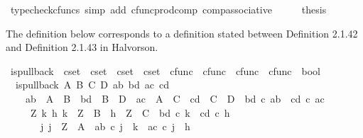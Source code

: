 \begin{isabellebody}
\ {\isacharparenleft}{\kern0pt}typecheck{\isacharunderscore}{\kern0pt}cfuncs{\isacharcomma}{\kern0pt}\ simp\ add{\isacharcolon}{\kern0pt}\ cfunc{\isacharunderscore}{\kern0pt}prod{\isacharunderscore}{\kern0pt}comp\ comp{\isacharunderscore}{\kern0pt}associative{}{\isacharparenright}{\kern0pt}\isanewline
\ \ \isamarkupfalse%
\ \isamarkupfalse%
\ {\isacharquery}{\kern0pt}thesis\isacommand{{\isachardot}{\kern0pt}}\isamarkupfalse%
\isanewline
{}\isamarkupfalse%
%
\endisatagproof
{\isafoldproof}%
%
\isadelimproof
%
\endisadelimproof
%
\isadelimdocument
%
\endisadelimdocument
%
\isatagdocument
%
\isamarkuptrue%
%
\endisatagdocument
{\isafolddocument}%
%
\isadelimdocument
%
\endisadelimdocument
%
\begin{isamarkuptext}%
The definition below corresponds to a definition stated between Definition 2.1.42 and Definition 2.1.43 in Halvorson.%
\end{isamarkuptext}\isamarkuptrue%
\isamarkupfalse%
\ is{\isacharunderscore}{\kern0pt}pullback\ {\isacharcolon}{\kern0pt}{\isacharcolon}{\kern0pt}\ {\isachardoublequoteopen}cset\ {\isasymRightarrow}\ cset\ {\isasymRightarrow}\ cset\ {\isasymRightarrow}\ cset\ {\isasymRightarrow}\ cfunc\ {\isasymRightarrow}\ cfunc\ {\isasymRightarrow}\ cfunc\ {\isasymRightarrow}\ cfunc\ {\isasymRightarrow}\ bool{\isachardoublequoteclose}\ \isanewline
\ \ {\isachardoublequoteopen}is{\isacharunderscore}{\kern0pt}pullback\ A\ B\ C\ D\ ab\ bd\ ac\ cd\ {\isasymlongleftrightarrow}\ \isanewline
\ \ \ \ {\isacharparenleft}{\kern0pt}ab\ {\isacharcolon}{\kern0pt}\ A\ {\isasymrightarrow}\ B\ {\isasymand}\ bd\ {\isacharcolon}{\kern0pt}\ B\ {\isasymrightarrow}\ D\ {\isasymand}\ ac\ {\isacharcolon}{\kern0pt}\ A\ {\isasymrightarrow}\ C\ {\isasymand}\ cd\ {\isacharcolon}{\kern0pt}\ C\ {\isasymrightarrow}\ D\ {\isasymand}\ bd\ {\isasymcirc}\isactrlsub c\ ab\ {\isacharequal}{\kern0pt}\ cd\ {\isasymcirc}\isactrlsub c\ ac\ {\isasymand}\ \isanewline
\ \ \ \ {\isacharparenleft}{\kern0pt}{\isasymforall}\ Z\ k\ h{\isachardot}{\kern0pt}\ {\isacharparenleft}{\kern0pt}k\ {\isacharcolon}{\kern0pt}\ Z\ {\isasymrightarrow}\ B\ {\isasymand}\ h\ {\isacharcolon}{\kern0pt}\ Z\ {\isasymrightarrow}\ C\ {\isasymand}\ bd\ {\isasymcirc}\isactrlsub c\ k\ {\isacharequal}{\kern0pt}\ cd\ {\isasymcirc}\isactrlsub c\ h{\isacharparenright}{\kern0pt}\ \ {\isasymlongrightarrow}\isanewline
\ \ \ \ \ \ {\isacharparenleft}{\kern0pt}{\isasymexists}{\isacharbang}{\kern0pt}\ j{\isachardot}{\kern0pt}\ j\ {\isacharcolon}{\kern0pt}\ Z\ {\isasymrightarrow}\ A\ {\isasymand}\ ab\ {\isasymcirc}\isactrlsub c\ j\ {\isacharequal}{\kern0pt}\ k\ {\isasymand}\ ac\ {\isasymcirc}\isactrlsub c\ j\ {\isacharequal}{\kern0pt}\ h{\isacharparenright}{\kern0pt}{\isacharparenright}{\kern0pt}{\isacharparenright}{\kern0pt}{\isachardoublequoteclose}\isanewline

\end{isabellebody}
